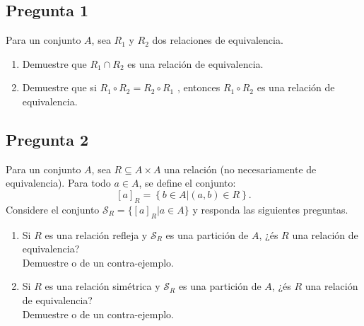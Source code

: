 \documentclass[letter]{article}
\begin{document}
	
	\begin{pregunta}{1} %
		\section*{Pregunta 1}
		Para un conjunto $A$, sea $R_1$ y $R_2$ dos relaciones de equivalencia.
		\begin{enumerate}
		\item Demuestre que $R_1 \cap R_2$ es una relación de equivalencia.
		\item Demuestre que si $R_1 \circ R_2=R_2 \circ R_1 $ , entonces $R_1 \circ R_2$ es una relación de equivalencia.
		\end{enumerate}
		
	\end{pregunta}
	
	\begin{pregunta}{2}
		\section*{Pregunta 2}
		Para un conjunto $A$, sea $R\subseteq A\times A$ una relación (no necesariamente de equivalencia). Para todo $a\in A$, se define el conjunto:
		$$ [a]_{R}=\left\lbrace b\in A | (a,b)\in R\right\rbrace.$$
		Considere el conjunto $\mathcal{S}_R=\{[a]_R|a\in A\}$ y responda las siguientes preguntas.
		\begin{enumerate}
		\item Si $R$ es una relación refleja y $\mathcal{S}_R$ es una partición de $A$, ¿és $R$ una relación de equivalencia?\\
		Demuestre o de un contra-ejemplo.
		\item Si $R$ es una relación simétrica y $\mathcal{S}_R$ es una partición de $A$, ¿és $R$ una relación de equivalencia?\\
		Demuestre o de un contra-ejemplo.
		\end{enumerate}
		
	\end{pregunta}
\end{document}
